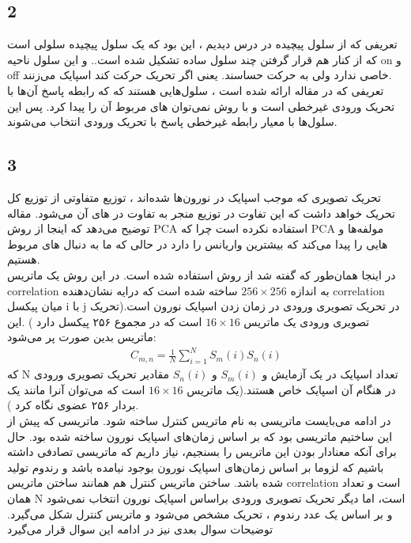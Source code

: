 \documentclass[12 pt]{article}
\begin{document}
\subsection*{2}
تعریفی که از سلول پیچیده در درس دیدیم ، این بود که یک سلول پیچیده سلولی است که از کنار هم قرار گرفتن چند سلول ساده تشکیل شده است.. و این سلول ناحیه on و off خاصی ندارد ولی به حرکت حساسند. یعنی اگر تحریک حرکت کند اسپایک می‌زنند.\\
تعریفی که در مقاله ارائه شده است ، سلول‌هایی هستند که که رابطه پاسخ آن‌ها با تحریک ورودی غیرخطی است و با روش
نمی‌توان 
های مربوط آن را پیدا کرد. پس این سلول‌ها با معیار رابطه غیرخطی پاسخ با تحریک ورودی انتخاب می‌شوند. 
\subsection*{3}
تحریک تصویری که موجب اسپایک در نورون‌ها شده‌اند ، توزیع متفاوتی از توزیع کل تحریک خواهد داشت که این تفاوت در توزیع منجر به تفاوت در 
های آن می‌شود. مقاله توضیح می‌دهد که اینجا از روش PCA استفاده نکرده است چرا که PCA مولفه‌ها و 
هایی
 را پیدا می‌کند که بیشترین واریانس را دارد در حالی که ما به دنبال 
 های مربوط هستیم. \\
 در اینجا همان‌طور که گفته شد از روش 
 استفاده شده است. در این روش یک ماتریس correlation به اندازه 
 $256\times 256$
 ساخته شده است که درایه 
 نشان‌دهنده correlation میان پیکسل i با j در تحریک تصویری ورودی در زمان زدن اسپایک نورون است.(تحریک تصویری ورودی یک ماتریس 
 $16\times 16$
 است که در مجموع ۲۵۶ پیکسل دارد
 )
 .این ماتریس بدین صورت پر می‌شود:
 \begin{align*}
 C_{m,n} = \frac{1}{N} \sum_{i=1}^{N} S_m(i)S_n(i)
 \end{align*}
 که N تعداد اسپایک در یک آزمایش و 
 $S_m(i)$
 و 
 $S_n(i)$
 مقادیر تحریک تصویری ورودی در هنگام آن اسپایک خاص هستند.(یک ماتریس 
 $16\times 16 $
 است که می‌توان آنرا مانند یک بردار ۲۵۶ عضوی نگاه کرد
 ).\\
 در ادامه می‌بایست ماتریسی به نام ماتریس کنترل ساخته شود. ماتریسی که پیش از این ساختیم ماتریسی بود که بر اساس زمان‌های اسپایک‌ نورون ساخته شده بود. حال برای آنکه معنادار بودن این ماتریس را بسنجیم، نیاز داریم که ماتریسی تصادفی داشته باشیم که لزوما بر اساس زمان‌های اسپایک نورون بوجود نیامده باشد و رندوم تولید شده باشد.  ساختن ماتریس کنترل هم همانند ساختن ماتریس correlation است و تعداد همان N است، اما دیگر تحریک تصویری ورودی براساس اسپایک نورون انتخاب نمی‌شود و بر اساس یک عدد رندوم ،‌ تحریک مشخص می‌شود و ماتریس کنترل شکل می‌گیرد. توضیحات سوال بعدی نیز در ادامه این سوال قرار می‌گیرد
\end{document}
